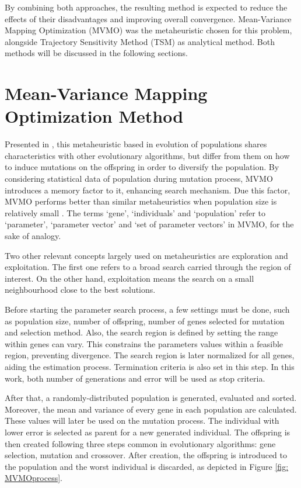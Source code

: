 By combining both approaches, the resulting method is expected to reduce the effects of their disadvantages and improving overall convergence. Mean-Variance Mapping Optimization (MVMO) was the metaheuristic chosen for this problem, alongside Trajectory Sensitivity Method (TSM) as analytical method. Both methods will be discussed in the following sections.

\section{Mean-Variance Mapping Optimization Method}

Presented in \cite{Erlich2010}, this metaheuristic based in evolution of populations shares characteristics with other evolutionary algorithms, but differ from them on how to induce mutations on the offspring in order to diversify the population. By considering statistical data of population during mutation process, MVMO introduces a memory factor to it, enhancing search mechanism. Due this factor, MVMO performs better than similar metaheuristics when population size is relatively small \cite{Nakawiro2011}. The terms `gene', `individuals' and `population' refer to `parameter', `parameter vector' and `set of parameter vectors' in MVMO, for the sake of analogy.

Two other relevant concepts largely used on metaheuristics are exploration and exploitation. The first one refers to a broad search carried through the region of interest. On the other hand, exploitation means the search on a small neighbourhood close to the best solutions.

Before starting the parameter search process, a few settings must be done, such as population size, number of offspring, number of genes selected for mutation and selection method. Also, the search region is defined by setting the range within genes can vary. This constrains the parameters values within a feasible region, preventing divergence. The search region is later normalized for all genes, aiding the estimation process. Termination criteria is also set in this step. In this work, both number of generations and error will be used as stop criteria.

After that, a randomly-distributed population is generated, evaluated and sorted. Moreover, the mean and variance of every gene in each population are calculated. These values will later be used on the mutation process. The individual with lower error is selected as parent for a new generated individual. The offspring is then created following three steps common in evolutionary algorithms: gene selection, mutation and crossover. After creation, the offspring is introduced to the population and the worst individual is discarded, as depicted in Figure \ref{fig: MVMOprocess}.

